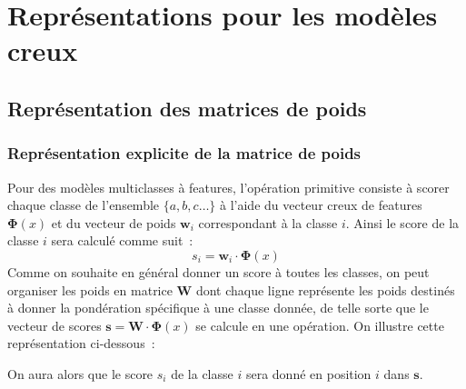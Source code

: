 \documentclass[11pt,openany]{book}
\begin{document}
\appendix
\chapter{Représentations pour les modèles creux}
\section{Représentation des matrices de poids}

\subsection{Représentation explicite de la matrice de poids}

Pour des modèles multiclasses à features,
l'opération primitive consiste à scorer chaque classe de l'ensemble $\{a,b,c\ldots\}$ à l'aide du vecteur creux de features $\boldsymbol\Phi(x)$ et du vecteur de poids $\mathbf{w}_i$ correspondant à la classe $i$. Ainsi le score de la classe $i$ sera calculé comme suit~:
\begin{displaymath}
s_i =  \mathbf{w}_i \cdot \boldsymbol\Phi(x)
\end{displaymath}
Comme on souhaite en général donner un score à toutes les classes, on peut organiser les poids en matrice $\mathbf{W}$ dont chaque ligne représente les poids destinés à donner la pondération spécifique à une classe donnée, de telle sorte que le vecteur de scores $\mathbf{s} = \mathbf{W}\cdot \boldsymbol\Phi(x)$ se calcule en une opération.
On illustre cette représentation ci-dessous~:
\begin{center}
\end{center}
On aura alors que le score $s_i$ de la classe $i$ sera donné en position $i$ dans $\mathbf{s}$.
\end{document}
